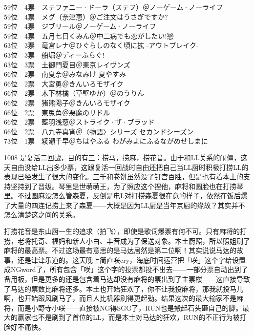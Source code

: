 {    59位　4票　ステファニー·ドーラ（ステフ）＠ノーゲーム·ノーライフ\\
    59位　4票　メグ（奈津恵）＠ご注文はうさぎですか?\\
    59位　4票　ジブリール＠ノーゲーム·ノーライフ\\
    59位　4票　五月七日くみん＠中二病でも恋がしたい!戀\\
    63位　3票　竜宮レナ＠ひぐらしのなく頃に拡 -アウトブレイク-\\
    63位　3票　船堀＠ディーふらぐ!\\
    63位　3票　土御門夏目＠東京レイヴンズ\\
    66位　2票　南夏奈＠みなみけ 夏やすみ\\
    66位　2票　大宮勇＠きんいろモザイク\\
    66位　2票　木下林檎（草壁ゆか）＠のうりん\\
    66位　2票　猪熊陽子＠きんいろモザイク\\
    66位　2票　東兎角＠悪魔のリドル\\
    66位　2票　藍羽浅葱＠ストライク·ザ·ブラッド\\
    66位　2票　八九寺真宵＠〈物語〉シリーズ セカンドシーズン\\
    73位　1票　綾瀬千早＠ちはやふる わがみよにふるながめせしまに
}

1008 是复活二回战，目的有三：捞马，捞麻，捞花音。由于和LL关系的闹僵，这天自由没给LL出多少票，这跟复活一回战时自由还把自己当LL厨时积极打捞LL的表现已经发生了很大的变化。三千和卷饼虽然没了钉宫百胜，但是也有着本土的支持坚持到了晋级。琴里是世萌萌王，为了照应这个捏他，麻将和圆脸也在打捞琴里。不过圆麻没怎么管森夏，反倒是电L对打捞森夏很在意的样子，依然在饭后爆了大量的四连记捞上来了森夏——大概是因为LL厨是当年京厨的缘故？其实并不怎么清楚这之间的关系。

打捞花音是东山厨一生的追求（拍飞），即使是歌词爆票有何不可。只有麻将的打捞，老将托奇、福妈和新人小白、丰音成为了保送对象。本土厨照，所以照姐刷了麻将的最高票。不过这场最有意思的是马达居然是第二位啊！其实说说马达的故事，还是津津乐道的。这天晚上简直咲cry，海底时间运营把「咲」这个字给设置成NGword了，所有包含「咲」这个字的投票都投不出去——一部分票自动出到了备用板，但是更多的还是包含着马达却没有麻将的票出到了主票楼——这直接导致了马达的票数比麻将还多。本土也开始狂欢了，你不让我投麻将，那我就投马儿啊，也开始跟风刷马了，而且人比机器刷得更起劲。结果这次的最大输家不是麻将，而是小野寺小咲——直接被NG得SGG了，RUN也是搬起石头砸自己的脚。最大的赢家也不是刷到了首位的LL，而是本土对马达的狂欢，RUN的不正行为被打脸好不痛快。

